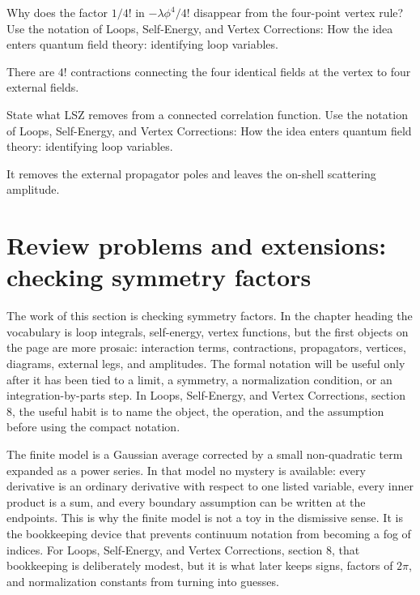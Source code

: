 \begin{exercise}
Why does the factor \(1/4!\) in \(-\lambda\phi^4/4!\) disappear from the four-point vertex rule?  Use the notation of Loops, Self-Energy, and Vertex Corrections: How the idea enters quantum field theory: identifying loop variables.
\begin{answer}
There are \(4!\) contractions connecting the four identical fields at the vertex to four external fields.
\end{answer}
\end{exercise}

\begin{exercise}
State what LSZ removes from a connected correlation function.  Use the notation of Loops, Self-Energy, and Vertex Corrections: How the idea enters quantum field theory: identifying loop variables.
\begin{answer}
It removes the external propagator poles and leaves the on-shell scattering amplitude.
\end{answer}
\end{exercise}



\section{Review problems and extensions: checking symmetry factors}

The work of this section is checking symmetry factors.  In the chapter heading the vocabulary is loop integrals, self-energy, vertex functions, but the first objects on the page are more prosaic: interaction terms, contractions, propagators, vertices, diagrams, external legs, and amplitudes.  The formal notation will be useful only after it has been tied to a limit, a symmetry, a normalization condition, or an integration-by-parts step.  In Loops, Self-Energy, and Vertex Corrections, section 8, the useful habit is to name the object, the operation, and the assumption before using the compact notation.

The finite model is a Gaussian average corrected by a small non-quadratic term expanded as a power series.  In that model no mystery is available: every derivative is an ordinary derivative with respect to one listed variable, every inner product is a sum, and every boundary assumption can be written at the endpoints.  This is why the finite model is not a toy in the dismissive sense.  It is the bookkeeping device that prevents continuum notation from becoming a fog of indices.  For Loops, Self-Energy, and Vertex Corrections, section 8, that bookkeeping is deliberately modest, but it is what later keeps signs, factors of \(2\pi\), and normalization constants from turning into guesses.

